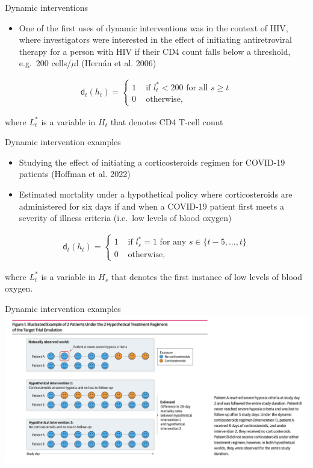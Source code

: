 \documentclass[
  10pt,
  ignorenonframetext,
]{beamer}
\providecommand{\tightlist}{%
  \setlength{\itemsep}{0pt}\setlength{\parskip}{0pt}}\usepackage{longtable,booktabs,array}
\begin{document}
\begin{frame}{Dynamic interventions}
\protect\hypertarget{dynamic-interventions-1}{}
\begin{itemize}
\tightlist
\item
  One of the first uses of dynamic interventions was in the context of
  HIV, where investigators were interested in the effect of initiating
  antiretroviral therapy for a person with HIV if their CD4 count falls
  below a threshold, e.g.~200 cells/\(\mu\)l (Hernán et al. 2006)
\end{itemize}

\begin{align}
\mathsf{d}_t(h_t)=\begin{cases}
      1 &\text{ if } l_t^*<200 \text{ for all } s \ge t\\
      0&\text{ otherwise,}
\end{cases}
\end{align}

where \(L_t^*\) is a variable in \(H_t\) that denotes CD4 T-cell count
\end{frame}

\begin{frame}{Dynamic intervention examples}
\protect\hypertarget{dynamic-intervention-examples}{}
\begin{itemize}
\item
  Studying the effect of initiating a corticosteroids regimen for
  COVID-19 patients (Hoffman et al. 2022)
\item
  Estimated mortality under a hypothetical policy where corticosteroids
  are administered for six days if and when a COVID-19 patient first
  meets a severity of illness criteria (i.e.~low levels of blood oxygen)
\end{itemize}

\begin{align}
\mathsf{d}_t(h_t)=\begin{cases}
      1 &\text{ if } l_s^*=1 \text{ for any } s\in\{t-5,\ldots, t\}\\
      0&\text{ otherwise,}
\end{cases}
\end{align}

where \(L_t^*\) is a variable in \(H_s\) that denotes the first instance
of low levels of blood oxygen.
\end{frame}

\begin{frame}{Dynamic intervention examples}
\protect\hypertarget{dynamic-intervention-examples-1}{}
\includegraphics{img/jama_dynamic.png}
\end{frame}
\end{document}
